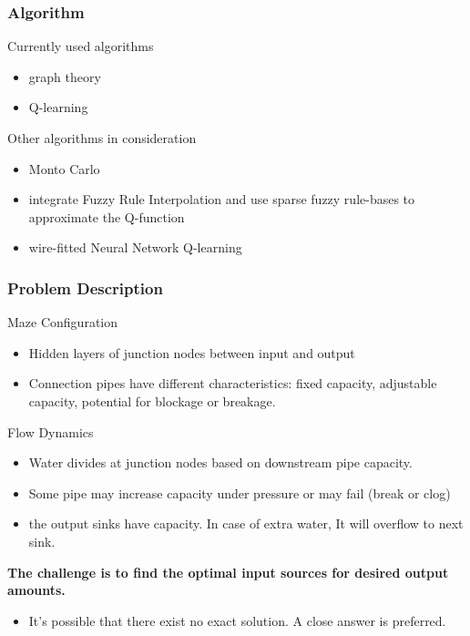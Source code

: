 \documentclass[notheorems, aspectratio=54]{beamer}
\begin{document}
\begin{frame}
	\frametitle{Algorithm}
	Currently used algorithms
	\begin{itemize}
		\item graph theory
		\item Q-learning
	\end{itemize}
	Other algorithms in consideration
	\begin{itemize}
		\item Monto Carlo
		\item integrate Fuzzy Rule Interpolation and use sparse fuzzy rule-bases to approximate the Q-function
		\item wire-fitted Neural Network Q-learning
	\end{itemize}
\end{frame}

\begin{frame}
	\frametitle{Problem Description}
	Maze Configuration
	\begin{itemize}
		\item Hidden layers of junction nodes between input and output
		\item Connection pipes have different characteristics: fixed capacity, adjustable capacity, potential for blockage or breakage.
	\end{itemize}
	Flow Dynamics
	\begin{itemize}
		\item Water divides at junction nodes based on downstream pipe capacity.
		\item Some pipe may increase capacity under pressure or may fail (break or clog)
		\item the output sinks have capacity. In case of extra water, It will overflow to next sink.
	\end{itemize}
\end{frame}

\begin{frame}
	\begin{center}
		\huge \textbf{The challenge is to find the optimal input sources for desired output amounts.}
	\end{center}
	\begin{itemize}
		\item It's possible that there exist no exact solution. A close answer is preferred.
	\end{itemize}
\end{frame}
\end{document}
